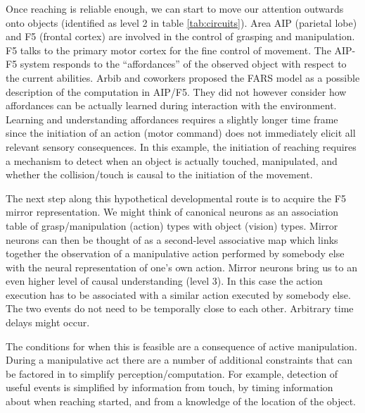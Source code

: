 Once reaching is reliable enough, we can start to move our attention 
outwards onto objects (identified as level 2 in table \ref{tab:circuits}). 
Area AIP (parietal lobe) and F5 (frontal cortex) are involved in the
control of grasping and manipulation. F5 talks to the 
primary motor cortex for the fine control of movement. 
The AIP-F5 system responds to the ``affordances'' of the observed 
object with respect to the current abilities.
Arbib and coworkers \cite{fagg-arbib-1998} proposed 
the FARS model as a possible description of the computation in AIP/F5. 
They did not however consider how affordances can be 
actually learned during interaction with the environment. 
Learning and understanding affordances requires a slightly longer 
time frame since the initiation of an action (motor command) does not
immediately elicit all relevant sensory consequences. In this example, the initiation
of reaching requires a mechanism to detect when an object is actually 
touched, manipulated, and whether the collision/touch is causal to the
initiation of the movement.

The next step along this hypothetical developmental route is to 
acquire the F5 mirror representation. We might think of canonical neurons as
an association table of grasp/manipulation (action) types with object
(vision) types.  Mirror neurons can then be thought of as a 
second-level associative map which links together the observation of 
a manipulative action performed by somebody else with the neural 
representation of one's own action.
Mirror neurons bring us to an even higher level of causal 
understanding (level 3). In this case the action execution has to be associated
with a similar action executed by somebody else. The two events
do not need to be temporally close to each other. Arbitrary time delays
might occur.

The conditions for when this is feasible are a consequence of active
manipulation. During a manipulative act there are a number of
additional constraints that can be factored in to simplify
perception/computation.  For example, detection of useful events is
simplified by information from touch, by timing information 
about when
reaching started, and from a knowledge of the location of the object.%

